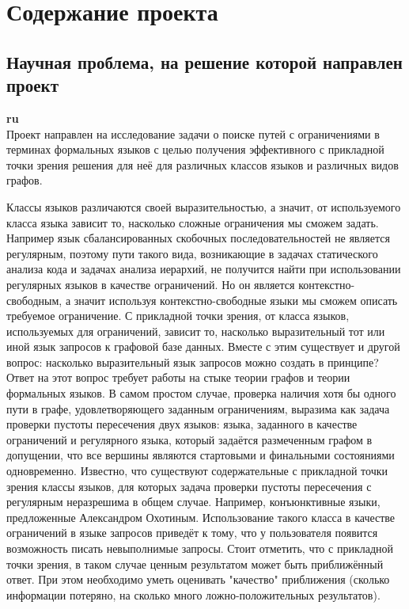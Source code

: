 \documentclass[12pt]{article}  %
\theoremstyle{remark}
\begin{document}
\section{Содержание проекта}

\subsection{Научная проблема, на решение которой направлен проект}

\textbf{ru}\\
%
Проект направлен на исследование задачи о поиске путей с ограничениями в терминах формальных языков с целью получения эффективного с прикладной точки зрения решения для неё для различных классов языков и различных видов графов.

Классы языков различаются своей выразительностью, а значит, от используемого класса языка зависит то, насколько сложные ограничения мы сможем задать.
Например язык сбалансированных скобочных последовательностей не является регулярным, поэтому пути такого вида, возникающие в задачах статического анализа кода и задачах анализа иерархий, не получится найти при использовании регулярных языков в качестве ограничений.
Но он является контекстно-свободным, а значит используя контекстно-свободные языки мы сможем описать требуемое ограничение.
С прикладной точки зрения, от класса языков, используемых для ограничений, зависит то, насколько выразительный тот или иной язык запросов к графовой базе данных.
Вместе с этим существует и другой вопрос: насколько выразительный язык запросов можно создать в принципе?
Ответ на этот вопрос требует работы на стыке теории графов и теории формальных языков.
В самом простом случае, проверка наличия хотя бы одного пути в графе, удовлетворяющего заданным ограничениям, выразима как задача проверки пустоты пересечения двух языков: языка, заданного в качестве ограничений и регулярного языка, который задаётся размеченным графом в допущении, что все вершины являются стартовыми и финальными состояниями одновременно.
Известно, что существуют содержательные с прикладной точки зрения классы языков, для которых задача проверки пустоты пересечения с регулярным неразрешима в общем случае.
Например, конъюнктивные языки, предложенные Александром Охотиным.
Использование такого класса в качестве ограничений в языке запросов приведёт к тому, что у пользователя появится возможность писать невыполнимые запросы.
Стоит отметить, что с прикладной точки зрения, в таком случае ценным результатом может быть приближённый ответ.
При этом необходимо уметь оценивать "качество" приближения (сколько информации потеряно, на сколько много ложно-положительных результатов).
\end{document}

